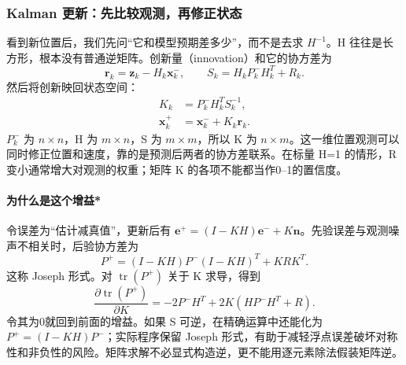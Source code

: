 \subsubsection{Kalman 更新：先比较观测，再修正状态}
看到新位置后，我们先问“它和模型预期差多少”，而不是去求 $H^{-1}$。H 往往是长方形，根本没有普通逆矩阵。创新量（innovation）和它的协方差为
\[
\boldsymbol r_k=\boldsymbol z_k-H_k\boldsymbol x_k^-,
\qquad S_k=H_kP_k^-H_k^T+R_k.
\]
然后将创新映回状态空间：
\begin{align}
K_k&=P_k^-H_k^TS_k^{-1},\\
\boldsymbol x_k^+&=\boldsymbol x_k^-+K_k\boldsymbol r_k.
\label{eq:final}
\end{align}
$P_k^-$ 为 $n\times n$，H 为 $m\times n$，S 为 $m\times m$，所以 K 为 $n\times m$。这一维位置观测可以同时修正位置和速度，靠的是预测后两者的协方差联系。在标量 H=1 的情形，R 变小通常增大对观测的权重；矩阵 K 的各项不能都当作0--1的置信度。

\paragraph*{为什么是这个增益*}
令误差为“估计减真值”，更新后有 $\boldsymbol e^+=(I-KH)\boldsymbol e^-+K\boldsymbol n$。先验误差与观测噪声不相关时，后验协方差为
\[
P^+=(I-KH)P^-(I-KH)^T+KRK^T.
\]
这称 Joseph 形式。对 $\operatorname{tr}(P^+)$ 关于 K 求导，得到
\[
\frac{\partial\operatorname{tr}(P^+)}{\partial K}
=-2P^-H^T+2K(HP^-H^T+R).
\]
令其为0就回到前面的增益。如果 S 可逆，在精确运算中还能化为 $P^+=(I-KH)P^-$；实际程序保留 Joseph 形式，有助于减轻浮点误差破坏对称性和非负性的风险。矩阵求解不必显式构造逆，更不能用逐元素除法假装矩阵逆。

